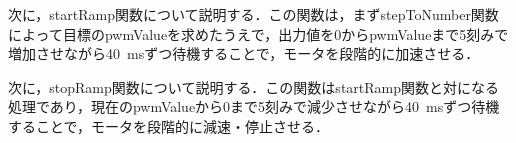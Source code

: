 
次に，startRamp関数について説明する．この関数は，まずstepToNumber関数によって目標のpwmValueを求めたうえで，出力値を0からpwmValueまで5刻みで増加させながら\SI{40}{ms}ずつ待機することで，モータを段階的に加速させる．

\FloatBarrier



次に，stopRamp関数について説明する．この関数はstartRamp関数と対になる処理であり，現在のpwmValueから0まで5刻みで減少させながら\SI{40}{ms}ずつ待機することで，モータを段階的に減速・停止させる．

\FloatBarrier



